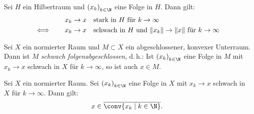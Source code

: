 \begin{thSatz}
    Sei $H$ ein Hilbertraum und $\kSeq x$ eine Folge in $H$. Dann gilt:
    \begin{align*}
        &x_k\to x \quad\text{stark in $H$ für $k\to\infty$} \\
        \iff\qquad 
        &x_k\to x \quad\text{schwach in $H$ und
            $\lVert x_k\rVert\to\lVert x\rVert$ für $k\to\infty$}
        \end{align*}
\end{thSatz}


\begin{thSatz}
    Sei $X$ ein normierter Raum und $M\subset X$ ein abgeschlossener, konvexer
    Unterraum. Dann ist $M$ \emph{schwach folgenabgeschlossen}, d.\,h.: Ist
    $\kSeq x$ eine Folge in $M$ mit $x_k\to x$ schwach in $X$ für $k\to\infty$,
    so ist auch $x\in M$.
\end{thSatz}


\begin{thLemma}
    Sei $X$ ein normierter Raum. Sei $\kSeq x$ eine Folge in $X$ mit
    $x_k\to x$ schwach in $X$ für $k\to\infty$.
    Dann gilt: 
    \[ x\in \setclosure{\conv\{x_k\Mid k\in\N\}}  . \]
\end{thLemma}


